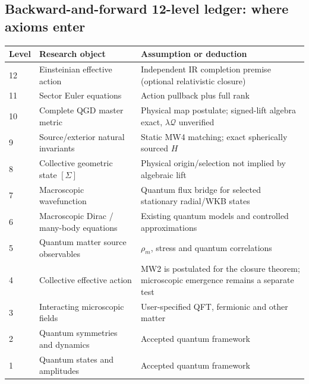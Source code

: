 \documentclass[11pt,a4paper]{article}
\theoremstyle{remark}\newtheorem{remark}[theorem]{Remark}
\begin{document}
\subsection{Backward-and-forward 12-level ledger: where axioms enter}\label{sec:v30-12}
\begin{center}\small\begin{tabularx}{\linewidth}{@{}p{12mm}p{50mm}X@{}}\toprule
\textbf{Level}&\textbf{Research object}&\textbf{Assumption or deduction}\\\midrule
12&Einsteinian effective action&Independent IR completion premise (optional relativistic closure)\\
11&Sector Euler equations&Action pullback plus full rank\\
10&Complete QGD master metric&Physical map postulate; signed-lift algebra exact, $\lambda\mathcal Q$ unverified\\
9&Source/exterior natural invariants&Static MW4 matching; exact spherically sourced $H$\\
8&Collective geometric state $[\Sigma]$&Physical origin/selection not implied by algebraic lift\\
7&Macroscopic wavefunction&Quantum flux bridge for selected stationary radial/WKB states\\
6&Macroscopic Dirac / many-body equations&Existing quantum models and controlled approximations\\
5&Quantum matter source observables&$\rho_m$, stress and quantum correlations\\
4&Collective effective action&MW2 is postulated for the closure theorem; microscopic emergence remains a separate test\\
3&Interacting microscopic fields&User-specified QFT, fermionic and other matter\\
2&Quantum symmetries and dynamics&Accepted quantum framework\\
1&Quantum states and amplitudes&Accepted quantum framework\\\bottomrule\end{tabularx}\end{center}
\end{document}
